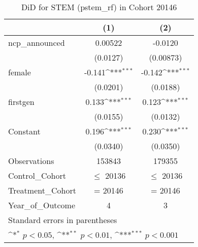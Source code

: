 \begin{table}[htbp]\centering
\def\sym#1{\ifmmode^{#1}\else\(^{#1}\)\fi}
\caption{DiD for STEM (pstem\_rf) in Cohort 20146}
\begin{tabular}{l*{2}{c}}
\toprule
                &\multicolumn{1}{c}{(1)}         &\multicolumn{1}{c}{(2)}         \\
\midrule
ncp\_announced   &  0.00522         &  -0.0120         \\
                & (0.0127)         &(0.00873)         \\
\addlinespace
female          &   -0.141\sym{***}&   -0.142\sym{***}\\
                & (0.0201)         & (0.0188)         \\
\addlinespace
firstgen        &    0.133\sym{***}&    0.123\sym{***}\\
                & (0.0155)         & (0.0132)         \\
\addlinespace
Constant        &    0.196\sym{***}&    0.230\sym{***}\\
                & (0.0340)         & (0.0350)         \\
\midrule
Observations    &   153843         &   179355         \\
Control\_Cohort  &$\le$ 20136         &$\le$ 20136         \\
Treatment\_Cohort&  = 20146         &  = 20146         \\
Year\_of\_Outcome &        4         &        3         \\
\bottomrule
\multicolumn{3}{l}{\footnotesize Standard errors in parentheses}\\
\multicolumn{3}{l}{\footnotesize \sym{*} \(p<0.05\), \sym{**} \(p<0.01\), \sym{***} \(p<0.001\)}\\
\end{tabular}
\end{table}
